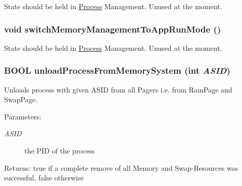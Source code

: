 State should be held in \hyperlink{struct_process}{Process} Management. Unused at the moment. \hypertarget{group___v_m_m_g5c5572a6e8f5df265dd936c6e3e9c062}{
\subsubsection[{switchMemoryManagementToAppRunMode}]{\setlength{\rightskip}{0pt plus 5cm}void switchMemoryManagementToAppRunMode ()}}
\label{group___v_m_m_g5c5572a6e8f5df265dd936c6e3e9c062}


State should be held in \hyperlink{struct_process}{Process} Management. Unused at the moment. \hypertarget{group___v_m_m_g8769d0f39e7a7bab4a27e72db8b31ef3}{
\subsubsection[{unloadProcessFromMemorySystem}]{\setlength{\rightskip}{0pt plus 5cm}BOOL unloadProcessFromMemorySystem (int {\em ASID})}}
\label{group___v_m_m_g8769d0f39e7a7bab4a27e72db8b31ef3}


Unloads process with given ASID from all Pagers i.e. from RamPage and SwapPage. \begin{Desc}
\item[Parameters:]
\begin{description}
\item[{\em ASID}]the PID of the process \end{description}
\end{Desc}
\begin{Desc}
\item[Returns:]true if a complete remove of all Memory and Swap-Resources was successful, false otherwise \end{Desc}
